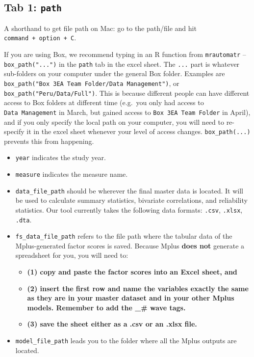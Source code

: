 \documentclass[
]{book}
\begin{document}
\hypertarget{tab-1-path}{%
\subsection{\texorpdfstring{Tab 1: \texttt{path}}{Tab 1: path}}\label{tab-1-path}}

A shorthand to get file path on Mac: go to the path/file and hit \texttt{command\ +\ option\ +\ C}.

If you are using Box, we recommend typing in an R function from \texttt{mrautomatr} -- \texttt{box\_path("...")} in the \texttt{path} tab in the excel sheet. The \texttt{...} part is whatever sub-folders on your computer under the general Box folder. Examples are \texttt{box\_path("Box\ 3EA\ Team\ Folder/Data\ Management")}, or \texttt{box\_path("Peru/Data/Full")}. This is because different people can have different access to Box folders at different time (e.g.~you only had access to \texttt{Data\ Management} in March, but gained access to \texttt{Box\ 3EA\ Team\ Folder} in April), and if you only specify the local path on your computer, you will need to re-specify it in the excel sheet whenever your level of access changes. \texttt{box\_path(...)} prevents this from happening.

\begin{itemize}
\item
  \texttt{year} indicates the study year.
\item
  \texttt{measure} indicates the measure name.
\item
  \texttt{data\_file\_path} should be wherever the final master data is located. It will be used to calculate summary statistics, bivariate correlations, and reliability statistics. Our tool currently takes the following data formats: \texttt{.csv}, \texttt{.xlsx}, \texttt{.dta}.
\item
  \texttt{fs\_data\_file\_path} refers to the file path where the tabular data of the Mplus-generated factor scores is saved. Because Mplus \textbf{does not} generate a spreadsheet for you, you will need to:

  \begin{itemize}
  \item
    \textbf{(1) copy and paste the factor scores into an Excel sheet, and}
  \item
    \textbf{(2) insert the first row and name the variables exactly the same as they are in your master dataset and in your other Mplus models. Remember to add the \_\# wave tags.}
  \item
    \textbf{(3) save the sheet either as a .csv or an .xlsx file.}
  \end{itemize}
\item
  \texttt{model\_file\_path} leads you to the folder where all the Mplus outputs are located.
\end{itemize}
\end{document}
